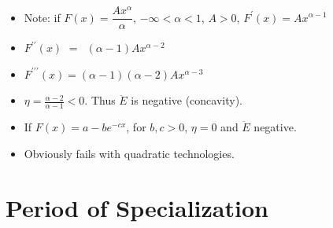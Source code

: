 \documentclass[12pt,compress,handout]{beamer}  %
\begin{document}
\begin{frame}

\begin{itemize}[<+->]
\item
Note: if $F(x) = \dfrac{Ax^{\alpha}}{\alpha}$, $-\infty<\alpha<1$, $A>0$,
$F^{\prime}(x)=Ax^{\alpha -1}$\vspace{.2in}

\item
$F^{\prime \prime }(x)$ $=$\ $(\alpha -1)Ax^{\alpha -2}$\vspace{.2in}

\item
$F^{\prime \prime \prime }(x)=(\alpha -1)(\alpha -2)Ax^{\alpha -3}$\vspace{.2in}

\item
$\eta=\frac{\alpha - 2}{\alpha - 1} < 0$. Thus $\ddot{E}$ is
negative (concavity).\vspace{.2in}

\item
If $F(x)=a-be^{-cx}$, for $b,c>0$, $\eta =0$ and $\ddot{E}$
negative.\vspace{.2in}

\item
Obviously fails with quadratic technologies.
\end{itemize}
\end{frame}


\section[Specialization]{Period of Specialization}
\end{document}
